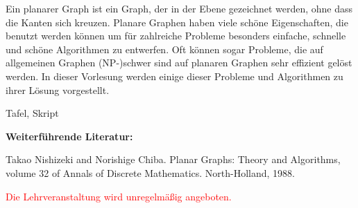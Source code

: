 \begin{course}
\begin{learningoutcomes}
\end{learningoutcomes}

\begin{content}
Ein planarer Graph ist ein Graph, der in der Ebene gezeichnet werden, ohne dass die Kanten sich kreuzen. Planare Graphen haben viele schöne Eigenschaften, die benutzt werden können um für zahlreiche Probleme besonders einfache, schnelle und schöne Algorithmen zu entwerfen. Oft können sogar Probleme, die auf allgemeinen Graphen (NP-)schwer sind auf planaren Graphen sehr effizient gelöst werden. In dieser Vorlesung werden einige dieser Probleme und Algorithmen zu ihrer Lösung vorgestellt.


\end{content}

\begin{media}Tafel, Skript

\end{media}

\begin{literature}\textbf{Weiterführende Literatur:}

 

Takao Nishizeki and Norishige Chiba. Planar Graphs: Theory and Algorithms, volume 32 of Annals of Discrete Mathematics. North-Holland, 1988.

\end{literature}

\begin{remarks}\textcolor{red}{Die Lehrveranstaltung wird unregelmäßig angeboten.}

\end{remarks}

\end{course}